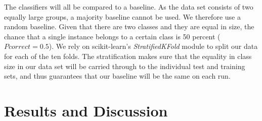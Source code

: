 \documentclass[
10pt, %
a4paper, %
oneside, %
headinclude,footinclude, %
] {book}%
\begin{document}
The classifiers will all be compared to a baseline. As the data set consists of two equally large groups, a majority baseline cannot be used. We therefore use a random baseline. Given that there are two classes and they are equal in size, the chance that a single instance belongs to a certain class is 50 percent ($Pcorrect = 0.5$). We rely on scikit-learn's \textit{StratifiedKFold} module to split our data for each of the ten folds. The stratification makes sure that the equality in class size in our data set will be carried through to the individual test and training sets, and thus guarantees that our baseline will be the same on each run.

\chapter{Results and Discussion}
\end{document}
